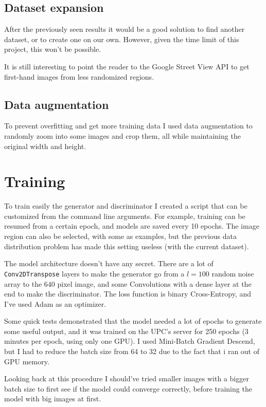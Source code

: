 \documentclass{article}
\begin{document}
\subsection{Dataset expansion}

After the previously seen results it would be a good solution to find another dataset, or to
create one on our own. However, given the time limit of this project, this won't be possible.

It is still interesting to point the reader to the Google Street View API \cite{streetViewAPI}
to get first-hand images from less randomized regions.

\subsection{Data augmentation}

To prevent overfitting and get more training data I used data augmentation to randomly zoom into
some images and crop them, all while maintaining the original width and height.

\section{Training}

To train easily the generator and discriminator I created a script that can be customized from
the command line arguments. For example, training can be resumed from a certain epoch, and models
are saved every 10 epochs. The image region can also be selected, with some as examples, but
the previous data distribution problem has made this setting useless (with the current dataset).

The model architecture doesn't have any secret. There are a lot of \texttt{Conv2DTranspose} layers
to make the generator go from a $l=100$ random noise array to the $640$ pixel image, and some
Convolutions with a dense layer at the end to make the discriminator. The loss function is
binary Cross-Entropy, and I've used Adam as an optimizer.

Some quick tests demonstrated that the model needed a lot of epochs to generate some
useful output, and it was trained on the UPC's server for 250 epochs (3 minutes per epoch, using
only one GPU). I used Mini-Batch Gradient Descend, but I had to reduce the batch size from 64 to
32 due to the fact that i ran out of GPU memory.

Looking back at this procedure I should've tried smaller images with a bigger batch size to first
see if the model could converge correctly, before training the model with big images at first.
\end{document}
